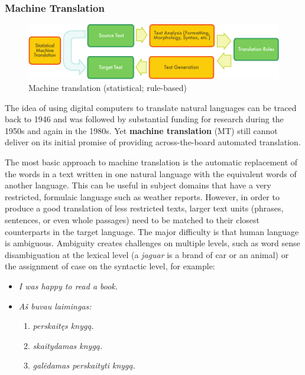 \begin{multicols}{2}
\subsubsection{Machine Translation}

\begin{figure}[htb]
  \center
  \includegraphics[width=\textwidth]{../_media/english/machine_translation}
  \caption{Machine translation (statistical; rule-based)}
\label{fig:mtarch_en}
\end{figure}

The idea of using digital computers to translate natural languages can be traced back to 1946 and was followed by substantial funding for research during the 1950s and again in the 1980s. 
Yet \textbf{machine translation} (MT) still cannot deliver on its initial promise of providing across-the-board automated translation.  


The most basic approach to machine translation is the automatic replacement of the words in a text written in one natural language with the equivalent words of another language. This can be useful in subject domains that have a very restricted, formulaic language such as weather reports.
However, in order to produce a good translation of less restricted texts, larger text units (phrases, sentences, or even whole passages) need to be matched to their closest counterparts in the target language. The major difficulty is that human language is ambiguous. Ambiguity creates challenges on multiple levels, such as word sense disambiguation at the lexical level (a \textit{jaguar} is a brand of car or an animal) or the assignment of case on the syntactic level, for example:

\begin{itemize}
\item \textit{I was happy to read a book.}
\item \textit{Aš buvau laimingas:}
  \begin{enumerate}
  \item \textit{perskaitęs knygą.}
  \item \textit{skaitydamas knygą.}
  \item \textit{galėdamas perskaityti knygą.}
  \end{enumerate}
\end{itemize}


\end{multicols}
